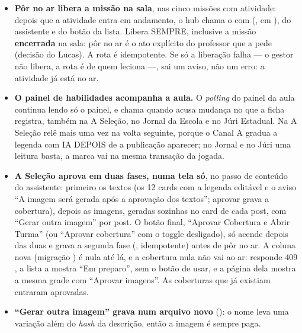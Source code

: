 \begin{itemize}
  \item \textbf{Pôr no ar libera a missão na sala}, nas cinco missões com
    atividade: depois que a atividade entra em andamento, o hub chama o
     com 
    (, em ), do
    assistente e do botão da lista. Libera SEMPRE, inclusive a missão
    \textbf{encerrada} na sala: pôr no ar é o ato explícito do professor que a
     pede (decisão do Lucas). A rota é idempotente. Se só a
    liberação falha --- o gestor não libera, a rota é de quem leciona ---, sai
    um aviso, não um erro: a atividade já está no ar.
  \item \textbf{O painel de habilidades acompanha a aula.} O \emph{polling} do
    painel da aula continua lendo só o painel, e chama 
    quando  acusa mudança no que a ficha registra, também
    na A Seleção, no Jornal da Escola e no Júri Estadual. Na A Seleção relê
    mais uma vez na volta seguinte, porque o Canal A gradua a legenda com IA
    DEPOIS de a publicação aparecer; no Jornal e no Júri uma leitura basta, a
    marca vai na mesma transação da jogada.
  \item \textbf{A Seleção aprova em duas fases, numa tela só}, no passo de
    conteúdo do assistente: primeiro os textos (os 12 cards com a legenda
    editável e o aviso \enquote{A imagem será gerada após a aprovação dos
    textos}; aprovar grava a cobertura), depois as imagens, geradas sozinhas no
    card de cada post, com \enquote{Gerar outra imagem} por post. O botão final,
    \enquote{Aprovar Cobertura e Abrir Turma} (ou \enquote{Aprovar cobertura}
    com o toggle desligado), só acende depois das duas e grava a segunda fase
    (, idempotente) antes de pôr
    no ar. A coluna nova 
    (migração ) é nula até
    lá, e a cobertura nula não vai ao ar:  responde
    409 , a lista a mostra \enquote{Em preparo}, sem
    o botão de usar, e a página dela mostra a mesma grade com
    \enquote{Aprovar imagens}. As coberturas que já existiam entraram
    aprovadas.
  \item \textbf{\enquote{Gerar outra imagem} grava num arquivo novo}
    (): o nome leva uma
    variação além do \emph{hash} da descrição, então a imagem é sempre paga.

\end{itemize}
